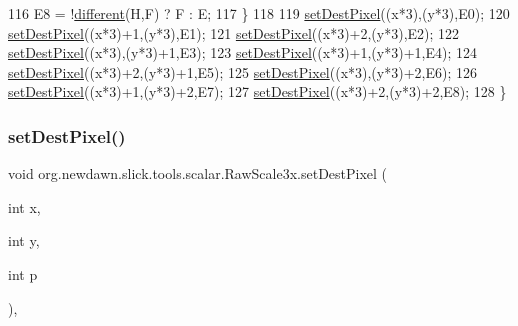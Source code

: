 \begin{DoxyCode}
116             E8 = !\mbox{\hyperlink{classorg_1_1newdawn_1_1slick_1_1tools_1_1scalar_1_1_raw_scale3x_ab50d19c762329489eae638dafb119a64}{different}}(H,F) ? F : E;
117         \}
118         
119         \mbox{\hyperlink{classorg_1_1newdawn_1_1slick_1_1tools_1_1scalar_1_1_raw_scale3x_a7ae43dc14708a76b767c92304a3fc9c2}{setDestPixel}}((x*3),(y*3),E0);
120         \mbox{\hyperlink{classorg_1_1newdawn_1_1slick_1_1tools_1_1scalar_1_1_raw_scale3x_a7ae43dc14708a76b767c92304a3fc9c2}{setDestPixel}}((x*3)+1,(y*3),E1);
121         \mbox{\hyperlink{classorg_1_1newdawn_1_1slick_1_1tools_1_1scalar_1_1_raw_scale3x_a7ae43dc14708a76b767c92304a3fc9c2}{setDestPixel}}((x*3)+2,(y*3),E2);
122         \mbox{\hyperlink{classorg_1_1newdawn_1_1slick_1_1tools_1_1scalar_1_1_raw_scale3x_a7ae43dc14708a76b767c92304a3fc9c2}{setDestPixel}}((x*3),(y*3)+1,E3);
123         \mbox{\hyperlink{classorg_1_1newdawn_1_1slick_1_1tools_1_1scalar_1_1_raw_scale3x_a7ae43dc14708a76b767c92304a3fc9c2}{setDestPixel}}((x*3)+1,(y*3)+1,E4);
124         \mbox{\hyperlink{classorg_1_1newdawn_1_1slick_1_1tools_1_1scalar_1_1_raw_scale3x_a7ae43dc14708a76b767c92304a3fc9c2}{setDestPixel}}((x*3)+2,(y*3)+1,E5);
125         \mbox{\hyperlink{classorg_1_1newdawn_1_1slick_1_1tools_1_1scalar_1_1_raw_scale3x_a7ae43dc14708a76b767c92304a3fc9c2}{setDestPixel}}((x*3),(y*3)+2,E6);
126         \mbox{\hyperlink{classorg_1_1newdawn_1_1slick_1_1tools_1_1scalar_1_1_raw_scale3x_a7ae43dc14708a76b767c92304a3fc9c2}{setDestPixel}}((x*3)+1,(y*3)+2,E7);
127         \mbox{\hyperlink{classorg_1_1newdawn_1_1slick_1_1tools_1_1scalar_1_1_raw_scale3x_a7ae43dc14708a76b767c92304a3fc9c2}{setDestPixel}}((x*3)+2,(y*3)+2,E8);
128     \}
\end{DoxyCode}
\mbox{\label{classorg_1_1newdawn_1_1slick_1_1tools_1_1scalar_1_1_raw_scale3x_a7ae43dc14708a76b767c92304a3fc9c2}} 
\subsubsection{\texorpdfstring{set\+Dest\+Pixel()}{setDestPixel()}}
{\footnotesize\ttfamily void org.\+newdawn.\+slick.\+tools.\+scalar.\+Raw\+Scale3x.\+set\+Dest\+Pixel (\begin{DoxyParamCaption}\item[{int}]{x,  }\item[{int}]{y,  }\item[{int}]{p }\end{DoxyParamCaption})\hspace{0.3cm}{\ttfamily [inline]}, {\ttfamily [private]}}

